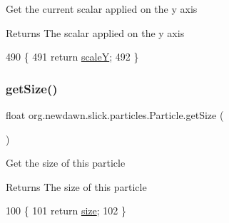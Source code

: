 Get the current scalar applied on the y axis

\begin{DoxyReturn}{Returns}
The scalar applied on the y axis 
\end{DoxyReturn}

\begin{DoxyCode}
490                              \{
491         \textcolor{keywordflow}{return} \mbox{\hyperlink{classorg_1_1newdawn_1_1slick_1_1particles_1_1_particle_a0dacb1e81d57ee4528c8ac82033eb585}{scaleY}};
492     \}
\end{DoxyCode}
\mbox{\label{classorg_1_1newdawn_1_1slick_1_1particles_1_1_particle_ab305952235946ee59244bb1edfb8c703}} 
\subsubsection{\texorpdfstring{get\+Size()}{getSize()}}
{\footnotesize\ttfamily float org.\+newdawn.\+slick.\+particles.\+Particle.\+get\+Size (\begin{DoxyParamCaption}{ }\end{DoxyParamCaption})\hspace{0.3cm}{\ttfamily [inline]}}

Get the size of this particle

\begin{DoxyReturn}{Returns}
The size of this particle 
\end{DoxyReturn}

\begin{DoxyCode}
100                            \{
101         \textcolor{keywordflow}{return} \mbox{\hyperlink{classorg_1_1newdawn_1_1slick_1_1particles_1_1_particle_a93954bf2e145c626121ad55dd164b9fc}{size}};
102     \}
\end{DoxyCode}
\mbox{\label{classorg_1_1newdawn_1_1slick_1_1particles_1_1_particle_a24dab75401a3c163f99d492293837a61}} 

